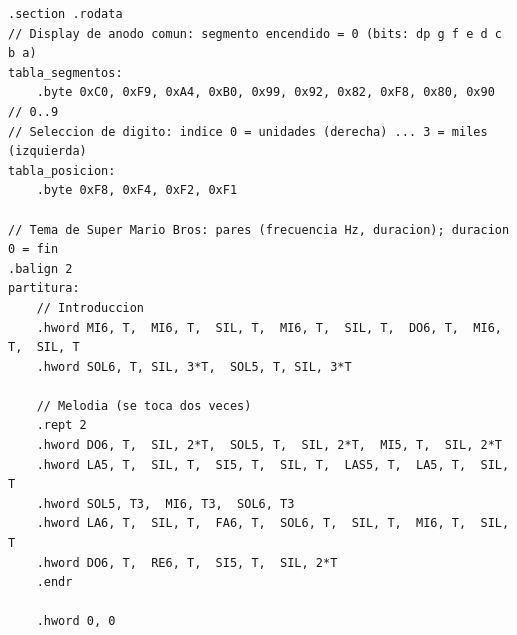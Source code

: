 \documentclass[11pt,letterpaper]{article}
\begin{document}
\begin{lstlisting}[firstnumber=1]
.section .rodata
// Display de anodo comun: segmento encendido = 0 (bits: dp g f e d c b a)
tabla_segmentos:
	.byte 0xC0, 0xF9, 0xA4, 0xB0, 0x99, 0x92, 0x82, 0xF8, 0x80, 0x90	// 0..9
// Seleccion de digito: indice 0 = unidades (derecha) ... 3 = miles (izquierda)
tabla_posicion:
	.byte 0xF8, 0xF4, 0xF2, 0xF1

// Tema de Super Mario Bros: pares (frecuencia Hz, duracion); duracion 0 = fin
.balign 2
partitura:
	// Introduccion
	.hword MI6, T,  MI6, T,  SIL, T,  MI6, T,  SIL, T,  DO6, T,  MI6, T,  SIL, T
	.hword SOL6, T, SIL, 3*T,  SOL5, T, SIL, 3*T

	// Melodia (se toca dos veces)
	.rept 2
	.hword DO6, T,  SIL, 2*T,  SOL5, T,  SIL, 2*T,  MI5, T,  SIL, 2*T
	.hword LA5, T,  SIL, T,  SI5, T,  SIL, T,  LAS5, T,  LA5, T,  SIL, T
	.hword SOL5, T3,  MI6, T3,  SOL6, T3
	.hword LA6, T,  SIL, T,  FA6, T,  SOL6, T,  SIL, T,  MI6, T,  SIL, T
	.hword DO6, T,  RE6, T,  SI5, T,  SIL, 2*T
	.endr

	.hword 0, 0
\end{lstlisting}
\end{document}
